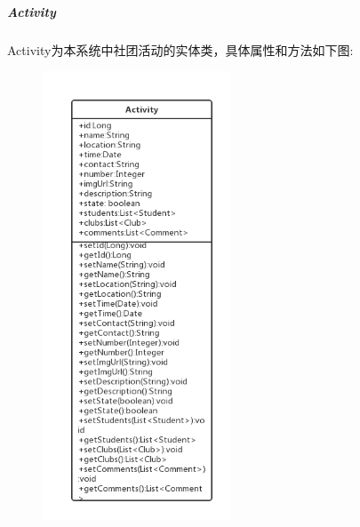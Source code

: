 \documentclass[UTF8]{ctexart}
\begin{document}
\subparagraph{Activity}
Activity为本系统中社团活动的实体类，具体属性和方法如下图:
\newline
\begin{figure}[H]
\centering
\includegraphics[width = 0.5\textwidth]{activity-class.png}
\end{figure}
\end{document}
